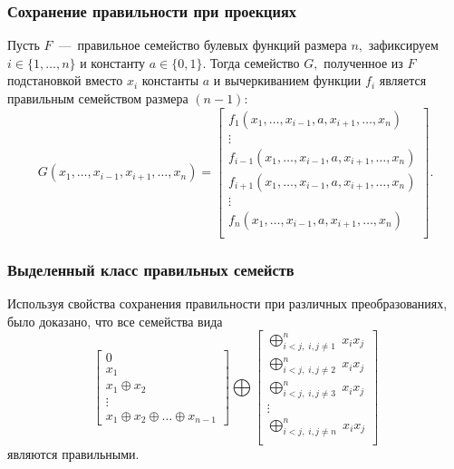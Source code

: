\begin{frame}
    \frametitle{Сохранение правильности при проекциях}
    \begin{thm}
        Пусть $F$~---~правильное семейство булевых функций размера $n,$ зафиксируем $i \in \{1, \ldots, n\}$ и константу ${a \in \{0, 1\}.}$
        Тогда семейство $G,$ полученное из $F$ подстановкой вместо $x_i$ константы $a$ и вычеркиванием функции $f_i$ является правильным семейством размера $(n-1)$:
        \[
            G(x_1,\ldots,x_{i-1}, x_{i+1}, \ldots, x_n) = 
            \begin{bmatrix}
                f_1(x_1,\ldots,x_{i-1}, a, x_{i+1}, \ldots, x_n) \\
                \vdots \\
                f_{i-1}(x_1,\ldots,x_{i-1}, a, x_{i+1}, \ldots, x_n) \\
                f_{i+1}(x_1,\ldots,x_{i-1}, a, x_{i+1}, \ldots, x_n) \\
                \vdots \\
                f_{n}(x_1,\ldots,x_{i-1}, a, x_{i+1}, \ldots, x_n) \\
            \end{bmatrix}.
        \]
    \end{thm}
\end{frame}


\begin{frame}
    \frametitle{Выделенный класс правильных семейств}
    Используя свойства сохранения правильности при различных преобразованиях, было доказано, что все семейства вида
    \begin{equation}
        \begin{bmatrix}
            0 \\
            x_1 \\
            x_1 \oplus x_2 \\
            \vdots \\
            x_1 \oplus x_2 \oplus \ldots \oplus x_{n-1}
            \end{bmatrix}
            \bigoplus
            \begin{bmatrix}
            \bigoplus_{i < j, \; i, j \ne 1}^n \; x_i x_j \\
            \bigoplus_{i < j, \; i, j \ne 2}^n \; x_i x_j \\
            \bigoplus_{i < j, \; i, j \ne 3}^n \; x_i x_j \\
            \vdots \\
            \bigoplus_{i < j, \; i, j \ne n}^n \; x_i x_j \\
        \end{bmatrix}
    \end{equation}
    являются правильными.
\end{frame}


